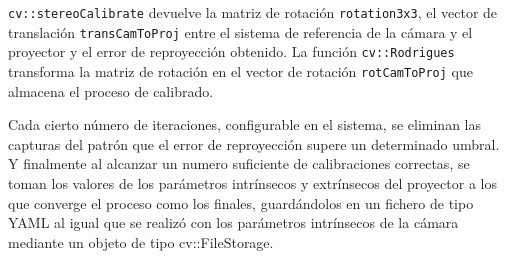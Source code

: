 \texttt{cv::stereoCalibrate} devuelve la matriz de rotación \texttt{rotation3x3}, el vector de translación \texttt{transCamToProj} entre el sistema de referencia de la cámara y el proyector y el error de reproyección obtenido. La función \texttt{cv::Rodrigues} transforma la matriz de rotación en el vector de rotación \texttt{rotCamToProj} que almacena el proceso de calibrado.

Cada cierto número de iteraciones, configurable en el sistema, se eliminan las capturas del patrón que el error de reproyección supere un determinado umbral. Y finalmente al alcanzar un numero suficiente de calibraciones correctas, se toman los valores de los parámetros intrínsecos y extrínsecos del proyector a los que converge el proceso como los finales, guardándolos en un fichero de tipo YAML al igual que se realizó con los parámetros intrínsecos de la cámara mediante un objeto de tipo cv::FileStorage. %


